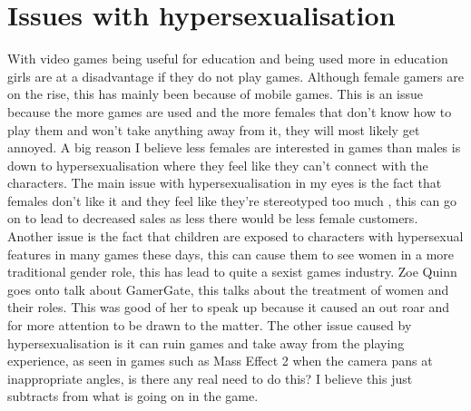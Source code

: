 \documentclass{scrartcl}
\begin{document}
\section{Issues with hypersexualisation}
With video games being useful for education\cite{lekka2014computer} and being used more in education\cite{jenson2007girls} girls are at a disadvantage if they do not play games\cite{jenson2007girls}. Although female gamers are on the rise, this has mainly been because of mobile games\cite{bbc}. This is an issue because the more games are used and the more females that don't know how to play them and won't take anything away from it, they will most likely get annoyed. A big reason I believe less females are interested in games than males is down to hypersexualisation where they feel like they can't connect with the characters. \newline
The main issue with hypersexualisation in my eyes is the fact that females don't like it and they feel like they're stereotyped too much \cite{heron2014sexism}, this can go on to lead to decreased sales as less there would be less female customers. \newline
Another issue is the fact that children are exposed to characters with hypersexual features\cite{martin2011playing} in many games these days, this can cause them to see women in a more traditional gender role\cite{martin2011playing}, this has lead to quite a sexist games industry. Zoe Quinn goes onto talk about GamerGate\cite{gamergate}\cite{bowey2017don}, this talks about the treatment of women and their roles. This was good of her to speak up because it caused an out roar and for more attention to be drawn to the matter. \newline
The other issue caused by hypersexualisation is it can ruin games and take away from the playing experience\cite{venturebeat}, as seen in games such as Mass Effect 2 when the camera pans at inappropriate angles, is there any real need to do this? I believe this just subtracts from what is going on in the game.
\end{document}
